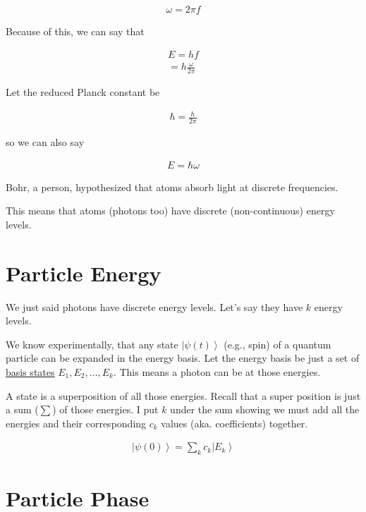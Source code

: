 \documentclass[
]{article}
\let\oldhyperref\hyperref
\renewcommand{\hyperref}[2][]{\oldhyperref[#1]{\underline{#2}}}
\providecommand{\ket}[1]{\left\lvert #1 \right\rangle}
\begin{document}
\begin{gather*}
	\omega=2\pi f
\end{gather*}

Because of this, we can say that

\begin{gather*}
	E=hf\\
	=h\frac{\omega}{2\pi}
\end{gather*}

Let the reduced Planck constant be

\begin{gather*}
	\hbar=\frac{h}{2\pi}
\end{gather*}

so we can also say

\begin{gather*}
	E=\hbar \omega
\end{gather*}

Bohr, a person, hypothesized that atoms absorb light at discrete
frequencies.

This means that atoms (photons too) have discrete (non-continuous)
energy levels.

\section{Particle Energy}\label{particle-energies}

We just said photons have discrete energy levels. Let's say they have
\(k\) energy levels.

We know experimentally, that any state \(\ket{\psi(t)}\) (e.g., spin) of
a quantum particle can be expanded in the energy basis. Let the energy
basis be just a set of \hyperref[basis-states]{basis states} \(E_1,E_2, …, E_k\). This means a
photon can be at those energies.

A state is a superposition of all those energies. Recall that a super
position is just a sum (\(\sum\)) of those energies. I put \(k\) under
the sum showing we must add all the energies and their corresponding
\(c_k\) values (aka. coefficients) together.

\begin{gather*}
	\ket{\psi(0)}=\sum_kc_k\ket{E_k}
\end{gather*}

\section{Particle Phase}\label{particle-phases}
\end{document}
